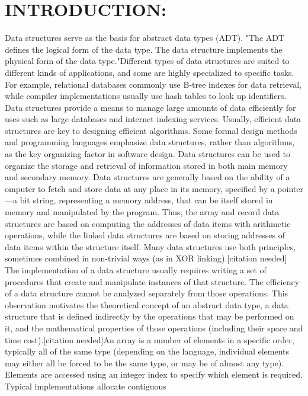 \documentclass{article}
\begin{document}
\section*{INTRODUCTION:}Data structures serve as the basis for abstract data 
types (ADT). "The ADT defines the logical form of 
the data type. The data structure implements the 
physical form of the data type."Different types of data 
structures are suited to different kinds of applications, 
and some are highly specialized to specific tasks. For 
example, relational databases commonly use B-tree 
indexes for data retrieval, while compiler 
implementations usually use hash tables to look up 
identifiers. Data structures provide a means to manage 
large amounts of data efficiently for uses such as large 
databases and internet indexing services. Usually, 
efficient data structures are key to designing efficient 
algorithms. Some formal design methods and 
programming languages emphasize data structures, 
rather than algorithms, as the key organizing factor in 
software design. Data structures can be used to 
organize the storage and retrieval of information 
stored in both main memory and secondary memory. 
Data structures are generally based on the ability of a omputer to fetch and store data at any place in its 
memory, specified by a pointer—a bit string, 
representing a memory address, that can be itself 
stored in memory and manipulated by the program. 
Thus, the array and record data structures are based on 
computing the addresses of data items with arithmetic 
operations, while the linked data structures are based 
on storing addresses of data items within the structure 
itself. Many data structures use both principles, 
sometimes combined in non-trivial ways (as in XOR 
linking).[citation needed] 
The implementation of a data structure usually 
requires writing a set of procedures that create and 
manipulate instances of that structure. The efficiency 
of a data structure cannot be analyzed separately from 
those operations. This observation motivates the 
theoretical concept of an abstract data type, a data 
structure that is defined indirectly by the operations 
that may be performed on it, and the mathematical 
properties of those operations (including their space 
and time cost).[citation needed]An array is a number 
of elements in a specific order, typically all of the 
same type (depending on the language, individual 
elements may either all be forced to be the same type, 
or may be of almost any type). Elements are accessed 
using an integer index to specify which element is 
required. Typical implementations allocate contiguous 
\end{document}
